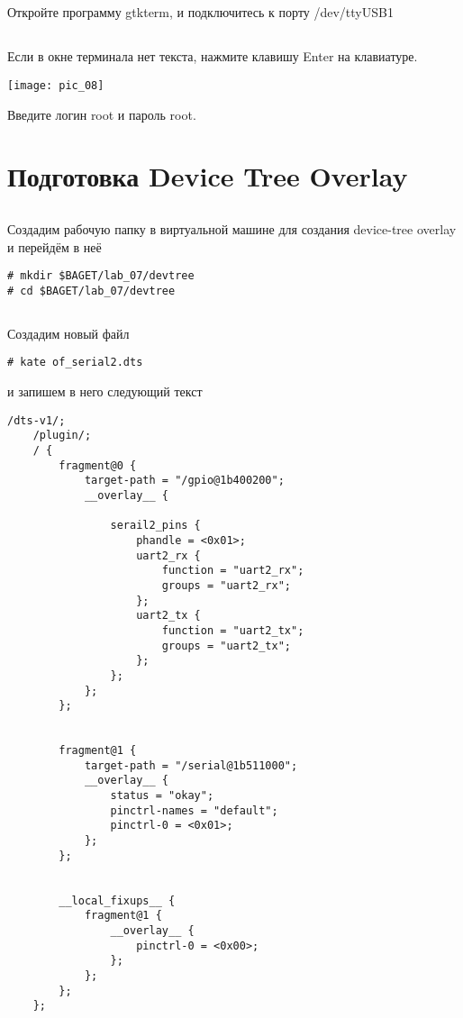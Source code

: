 \subsection{}Откройте программу gtkterm, и подключитесь к порту /dev/ttyUSB1

\subsection{}Если в окне терминала нет текста, нажмите клавишу Enter на клавиатуре.
\begin{center}
	\texttt{[image: pic\_08]}
\end{center}
Введите логин root и пароль root.


\section{Подготовка Device Tree Overlay}

\subsection{} Создадим рабочую папку в виртуальной машине для создания device-tree overlay и перейдём в неё 
\begin{lstlisting}[style=bash]
# mkdir $BAGET/lab_07/devtree
# cd $BAGET/lab_07/devtree 
\end{lstlisting}

\subsection{}Создадим новый файл
\begin{lstlisting}[style=bash]
# kate of_serial2.dts
\end{lstlisting}
и запишем в него следующий текст
\begin{lstlisting}[style=stdout]
	/dts-v1/;
	/plugin/;
	/ {
		fragment@0 {
			target-path = "/gpio@1b400200";
			__overlay__ {
				
				serail2_pins {
					phandle = <0x01>;
					uart2_rx {
						function = "uart2_rx";
						groups = "uart2_rx";
					};
					uart2_tx {
						function = "uart2_tx";
						groups = "uart2_tx";
					};
				};
			};
		};
		
		
		fragment@1 { 
			target-path = "/serial@1b511000"; 
			__overlay__ { 
				status = "okay"; 
				pinctrl-names = "default"; 
				pinctrl-0 = <0x01>; 
			}; 
		}; 
		
		
		__local_fixups__ {
			fragment@1 {
				__overlay__ {
					pinctrl-0 = <0x00>;
				};
			};	
		};
	};
\end{lstlisting}

